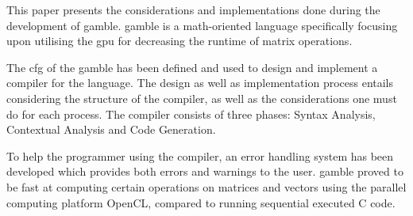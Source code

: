 This paper presents the considerations and implementations done during the development of \gls{gamble}.
\gls{gamble} is a math-oriented language specifically focusing upon utilising the \acrshort{gpu} for decreasing the runtime of matrix operations.

The \acrshort{cfg} of the \gls{gamble} has been defined and used to design and implement a compiler for the language.
The design as well as implementation process entails considering the structure of the compiler, as well as the considerations one must do for each process.
The compiler consists of three phases: Syntax Analysis, Contextual Analysis and Code Generation.

To help the programmer using the compiler, an error handling system has been developed which provides both errors and warnings to the user.
\gls{gamble} proved to be fast at computing certain operations on matrices and vectors using the parallel computing platform OpenCL, compared to running sequential executed C code.
